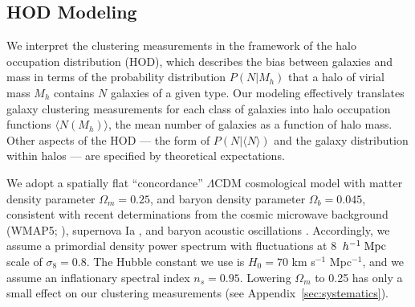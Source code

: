 \documentclass[]{emulateapj}
\newcommand{\hmpc}{\,h^{-1}\;{\rm Mpc}}
\begin{document}
\subsection{HOD Modeling}
\label{subsec:hod}

We interpret the clustering measurements in the framework of the halo 
occupation distribution (HOD), which describes the bias between galaxies and
mass in terms of the probability distribution $P(N|M_h)$ that a halo of virial
mass $M_h$ contains $N$ galaxies of a given type.   Our modeling effectively
translates galaxy clustering measurements for each class of galaxies into
halo occupation functions $\langle N(M_h)\rangle$, the
mean number of galaxies as a function of halo mass.
Other aspects of the HOD --- the form of $P(N|\langle N \rangle)$ and
the galaxy distribution within halos --- are specified  by theoretical 
expectations.

We adopt a spatially flat ``concordance'' $\Lambda$CDM cosmological model
with matter density parameter $\Omega_m=0.25$, and baryon density parameter
$\Omega_b=0.045$,  consistent with recent determinations from the cosmic
microwave background (WMAP5; \citealt{hinshaw09,dunkley09,komatsu09}),
supernova Ia \citep{kowalski08,kessler09}, and baryon acoustic oscillations
\citep{percival10}.  Accordingly, we assume a primordial density power
spectrum with 
fluctuations at 8 $\hmpc$ scale of $\sigma_8=0.8$. The Hubble constant
we use is $H_0 =70$ km s$^{-1}$ Mpc$^{-1}$, and we assume an
inflationary spectral index $n_s=0.95$. 
Lowering $\Omega_m$ to 0.25 has only a small effect on our clustering 
measurements (see Appendix~\ref{sec:systematics}).
\end{document}
